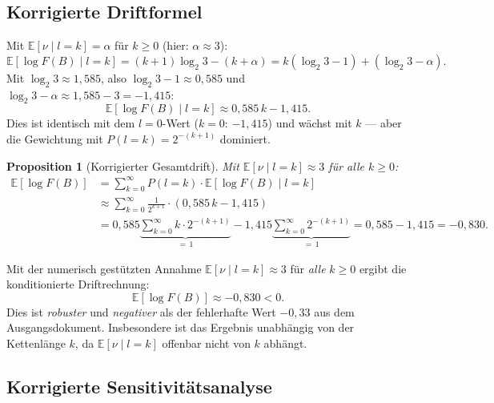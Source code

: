 \documentclass[12pt,a4paper]{article}
\newtheorem{proposition}[definition]{Proposition}
\newcommand{\E}{\mathbb{E}}
\newcommand{\logF}{\log F(B)}
\begin{document}
\subsection{Korrigierte Driftformel}

Mit $\E[\nu \mid l{=}k] = \alpha$ für $k \geq 0$ (hier: $\alpha \approx 3$):
\[
  \E[\logF \mid l = k]
  = (k+1)\log_2 3 - (k + \alpha)
  = k(\log_2 3 - 1) + (\log_2 3 - \alpha).
\]
Mit $\log_2 3 \approx 1{,}585$, also $\log_2 3 - 1 \approx 0{,}585$
und $\log_2 3 - \alpha \approx 1{,}585 - 3 = -1{,}415$:
\[
  \E[\logF \mid l = k] \approx 0{,}585\,k - 1{,}415.
\]
Dies ist identisch mit dem $l = 0$-Wert ($k = 0$: $-1{,}415$)
und wächst mit $k$ --- aber die Gewichtung mit $P(l{=}k) = 2^{-(k+1)}$ dominiert.

\begin{proposition}[Korrigierter Gesamtdrift]
\label{prop:korrekter_drift}
Mit $\E[\nu \mid l{=}k] \approx 3$ für alle $k \geq 0$:
\begin{align*}
  \E[\logF]
  &= \sum_{k=0}^{\infty} P(l{=}k) \cdot \E[\logF \mid l{=}k] \\
  &\approx \sum_{k=0}^{\infty} \frac{1}{2^{k+1}} \cdot (0{,}585\,k - 1{,}415) \\
  &= 0{,}585 \underbrace{\sum_{k=0}^{\infty} k \cdot 2^{-(k+1)}}_{= \,1}
    - 1{,}415 \underbrace{\sum_{k=0}^{\infty} 2^{-(k+1)}}_{= \,1}
  = 0{,}585 - 1{,}415 = -0{,}830.
\end{align*}
\end{proposition}

\begin{tcolorbox}[hauptsatz, title={Korrigiertes Hauptresultat (heuristisch)}]
Mit der numerisch gestützten Annahme $\E[\nu \mid l{=}k] \approx 3$
für \emph{alle} $k \geq 0$ ergibt die konditionierte Driftrechnung:
\[
  \boxed{\E[\logF] \approx -0{,}830 < 0.}
\]
Dies ist \emph{robuster} und \emph{negativer} als der fehlerhafte Wert
$-0{,}33$ aus dem Ausgangsdokument.
Insbesondere ist das Ergebnis unabhängig von der Kettenlänge $k$,
da $\E[\nu \mid l{=}k]$ offenbar nicht von $k$ abhängt.
\end{tcolorbox}

\subsection{Korrigierte Sensitivitätsanalyse}
\end{document}
